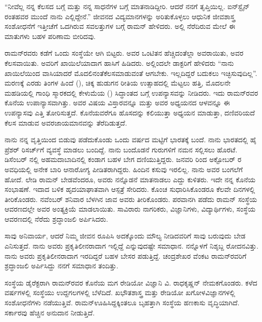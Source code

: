  “ನೀವೆಲ್ಲ ನನ್ನ ಕೆಲಸದ ಬಗ್ಗೆ ಮತ್ತು ನನ್ನ ಸಾಧನೆಗಳ ಬಗ್ಗೆ ಮಾತನಾಡಿದ್ದೀರಿ. ಆದರೆ ನನಗೆ ತೃಪ್ತಿಯಿಲ್ಲ. ಐನ್‍ಸ್ಟೈನ್ ರಂತಹವರ ಮುಂದೆ ನಾನು ಎಲ್ಲಿದ್ದೇನೆ.” ಜೀವನದ ವಿದ್ಯಮಾನಗಳನ್ನು ಅರಿತುಕೊಳ್ಳಲು ಆಧುನಿಕ ಜೀವಶಾಸ್ತ್ರ ಸಂಶೋಧನೆಗೆ ಇತ್ತೀಚೆಗೆ ಒದಗಿರುವ ಸವಲತ್ತುಗಳ ಬಗ್ಗೆ ರಾಮನ್ ಹೇಳಿದರು. ಅಲ್ಲಿ ನೆರೆದಿರುವ ಮೇಲೆ ಈ ಮಾತುಗಳು ಬಹಳ ಪರಿಣಾಮ ಬೀರಿದವು.

ರಾಮನ್‍ರವರು ಕಡೆಗೆ ಒಂದು ಸಂಸ್ಥೆಯೇ ಆಗಿ ಬಿಟ್ಟರು. ಅವರ ಒಂಟಿತನ ಹೆಚ್ಚಿದಂತೆಲ್ಲಾ ಅವರಾಯಿತು, ಅವರ ಕೆಲಸವಾಯಿತು. ಅವರಿಗೆ ಖಾಯಿಲೆಯಾದಾಗ ಹಾಸಿಗೆ ಹಿಡಿದರು. ಅಲ್ಲಿಂದಲೇ ಡಾಕ್ಟರಿಗೆ ಹೇಳಿದರು “ನಾನು ಖಾಯಿಲೆಯಿಂದ ವಾಸಿಯಾದರೆ ಮೊದಲಿನಂತೆ\break ಕೆಲಸಮಾಡುವಂತೆ ಆಗಬೇಕು. ಇಲ್ಲದಿದ್ದರೆ ಬದುಕಲು ಇಚ್ಛಿಸುವುದಿಲ್ಲ”. ಮರಣಕ್ಕೆ ಎರಡು ತಿಂಗಳ ಹಿಂದೆ (), ಚಿಕ್ಕ ಹುಡುಗನ ರೀತಿಯ ಉತ್ಸಾಹದಲ್ಲಿ ಮೆಟ್ಟಲು ಹತ್ತಿ, ಮೊದಲನೇ ಮಹಡಿಯಲ್ಲಿ ಗಾಂಧಿ ಸ್ಮಾರಕದಲ್ಲಿ ಕೇಳುಮೆಯ () ಸಿದ್ಧಾಂತದ ಬಗ್ಗೆ ಉಪನ್ಯಾಸವನ್ನು ನೀಡಿದರು. ಇದು ರಾಮನ್‍ರವರ ಕೊನೆಯ ಉಪಾನ್ಯಾಸವಾಗಿತ್ತು. ಅವರ ವಿಷಯ ವಿಸ್ತಾರವನ್ನೂ ಮತ್ತು ಅವರ ಅಧ್ಯಯನದ ಆಳವನ್ನೂ ಈ ಉಪನ್ಯಾಸವು ಎತ್ತಿ ತೋರಿಸುತ್ತದೆ. ಕೊನೆಯವರೆಗೂ ಹೊಸದನ್ನು ಕಲಿಯುತ್ತಾ ಅಧ್ಯಯನ ಮಾಡುತ್ತಾ, ದಣಿವರಿಯದೆ ಕೆಲಸ ಮಾಡುವ ಅವರ\break ಜಾಯಮಾನವನ್ನು ತೆರೆದಿಡುತ್ತದೆ.

ನಾನು ನನ್ನ ವೃತ್ತಿಯಿಂದ ಬಿಡುವು ಪಡೆದುಕೊಂಡು ಒಂದು ವರ್ಷದ ಮಟ್ಟಿಗೆ ಭಾರತಕ್ಕೆ ಬಂದೆ. ನಾನು ಭಾರತದಲ್ಲಿ ಹೈ ಪ್ರೆಶರ್ ರಿಸರ್ಚ್‌ಗೆ ವ್ಯವಸ್ಥೆ ಮಾಡಲು ಬಂದಿದ್ದೆ. ನಾನು ಬಂದೊಡನೆ ಗುರುಗಳಿಗೆ ನಮನ ಸಲ್ಲಿಸಲು ಹೊರಟೆ.  ಡಿಸೆಂಬರ್ ನಲ್ಲಿ ಅಹಮದಾಬಾದಿನಲ್ಲಿ ಕಂಡಾಗ ಬಹಳ ಬೇಗ ದಣಿಯುತ್ತಿದ್ದರು. ಜನವರಿ  ರಿಂದ ಅಕ್ಟೋಬರ್  ರ ಅವಧಿಯಲ್ಲಿ ಅನೇಕ ಬಾರಿ ಆನಾರೋಗ್ಯ ಪೀಡಿತರಾಗಿದ್ದರು. ಹಿಂದಿನ ಕಸುವು ಇರಲಿಲ್ಲ. ನಾನು ಅವರ ಬಂಗಲೆಗೆ ಹೋದೆ. ಲೇಡಿ ರಾಮನ್ ಬೇಡವೆಂದರೂ, ಅವರು ನನ್ನೊಡನೆ ಮಾತನಾಡಲು ಎದ್ದು ಕುಳಿತರು. ಇದೇ ನನ್ನ ಕೊನೆಯ ಸಂಭಾಷಣೆ. ಇದಾದ ಬಳಿಕ ಹೃದಯಾಘಾತವಾಗಿ ಆಸ್ಪತ್ರೆ ಸೇರಿದರು. ಕೊಂಚ ಸುಧಾರಿಸಿಕೊಂಡರೂ ಕೆಲವೇ ದಿನಗಳಲ್ಲಿ ತೀರಿಕೊಂಡರು. ನವೆಂಬರ್  ಶನಿವಾರ ಬೆಳಗಿನ ಜಾವ ಅವರು ತೀರಿಕೊಂಡರು. ಪರವಾನಗಿ ಪಡೆದು ರಾಮನ್ ಸಂಸ್ಥೆಯ ಆವರಣದಲ್ಲೇ ಅವರ ಅಂತ್ಯಕ್ರಿಯೆ ಮಾಡಲಾಯಿತು. ಸಾವಿರಾರು ನಾಗರಿಕರು, ವಿಜ್ಞಾನಿಗಳು, ವಿದ್ಯಾರ್ಥಿಗಳು, ಸಂಸ್ಥೆಯ ಆವರಣದಲ್ಲಿ ನೆರೆದು ಶ್ರದ್ಧಾಂಜಲಿ ಅರ್ಪಿಸಿದರು.

ಸಾವು ಅನಿವಾರ್ಯ, ಆದರೆ ನಿಮ್ಮ ಜೀವನ ರೂಪಿಸಿ ಅದಕ್ಕೊಂದು ಮೌಲ್ಯ ನೀಡಿದವರಿಗೆ ಸಾವು ಬರುವುದು ಬೇಡ ಎನಿಸುತ್ತದೆ. ನಾನು ಅವರು ಪ್ರಕೃತಿಲೀನರಾದಾಗ ಇಲ್ಲಿದ್ದೆ ಎನ್ನುವುದಷ್ಟೇ ಸಮಾಧಾನ. ನನ್ನೊಳಗೆ ನಿಶ್ಶಬ್ದ ರೋದನವಿತ್ತು. ನಾನು ಅವರು ಪ್ರಕೃತಿಲೀನರಾದಾಗ ಇರದಿದ್ದರೆ ಬಹಳ ಬೇಸರ ಪಡುತ್ತಿದ್ದೆ. ಚಂದ್ರಶೇಖರ ವೆಂಕಟ ರಾಮನ್‍ರವರಿಗೆ ಶ್ರದ್ಧಾಂಜಲಿ ಅರ್ಪಿಸಿದ್ದು ನನಗೆ ಸಮಾಧಾನ ತಂದಿತ್ತು.

ಸಂಸ್ಥೆಯ ಡೈರೆಕ್ಟರಾಗಿ ರಾಮನ್‍ರವರ ಕೊನೆಯ ಮಗ ರೇಡಿಯೋ ವಿಜ್ಞಾನಿ ವಿ. ರಾಧಕೃಷ್ಣನ್ ನೇಮಕಗೊಂಡರು. ಕಳೆದ  ವರ್ಷಗಳಲ್ಲಿ ಸಂಸ್ಥೆಯು ಉದ್ದಗಲಗಳಲ್ಲಿ ಬೆಳೆದಿದೆ. ಖಭೌತಶಾಸ್ತ್ರ ಮತ್ತು ರೇಡಿಯೋ ಖಗೋಳವಿಜ್ಞಾನಗಳಲ್ಲಿ ಸಂಶೋಧನೆಗಳು ನಡೆಯುತ್ತಿವೆ. ರಾಮನ್\break ಊಹಿಸಿದ್ದಕ್ಕಿಂತಲೂ ಬೃಹತ್ತಾಗಿ ಸಂಸ್ಥೆಯ ಹಣಕಾಸು ವೃದ್ಧಿಯಾಗಿದೆ. ಸರ್ಕಾರವು ಹೆಚ್ಚಿನ ಅನುದಾನ ನೀಡುತ್ತಿದೆ.

